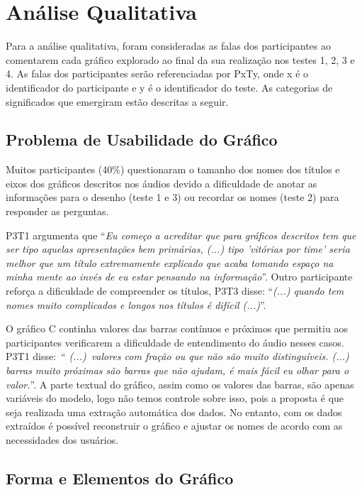 \documentclass[
	12pt,				%
	openright,			%
	oneside,			%
	a4paper,			%
	english,			%
	brazil				%
	]{abntex2}
\begin{document}
\section{Análise Qualitativa}

Para a análise qualitativa, foram consideradas as falas dos participantes ao comentarem cada gráfico explorado ao final da sua realização nos testes 1, 2, 3 e 4. As falas dos participantes serão referenciadas por PxTy, onde x é o identificador do participante e y é o identificador do teste. As categorias de significados que emergiram estão descritas a seguir.

\subsection{Problema de Usabilidade do Gráfico}

Muitos participantes (40\%) questionaram o tamanho dos nomes dos títulos e eixos dos gráficos descritos nos áudios devido a dificuldade de anotar as informações para o desenho (teste 1 e 3) ou recordar os nomes (teste 2) para responder as perguntas. 

P3T1 argumenta que ``\textit{Eu começo a acreditar que para gráficos descritos tem que ser tipo aquelas apresentações bem primárias, (...) tipo 'vitórias por time' seria melhor que um título extremamente explicado que acaba tomando espaço na minha mente ao invés de eu estar pensando na informação}''. Outro participante reforça a dificuldade de compreender os títulos, P3T3 disse: ``\textit{(...) quando tem nomes muito complicados e longos nos títulos é difícil (...)}''.  

O gráfico C continha valores das barras contínuos e próximos que permitiu aos participantes verificarem a dificuldade de entendimento do áudio nesses casos. P3T1 disse:~``\textit{ (...)~valores com fração ou que não são muito distinguíveis. (...) barras muito próximas são barras que não ajudam, é mais fácil eu olhar para o valor.}''.  A parte textual do gráfico, assim como os valores das barras, são apenas variáveis do modelo, logo não temos controle sobre isso, pois a proposta é que seja realizada uma extração automática dos dados. No entanto, com os dados extraídos é possível reconstruir o gráfico e ajustar os nomes de acordo com as necessidades dos usuários.

\subsection{Forma e Elementos do Gráfico}
\end{document}
